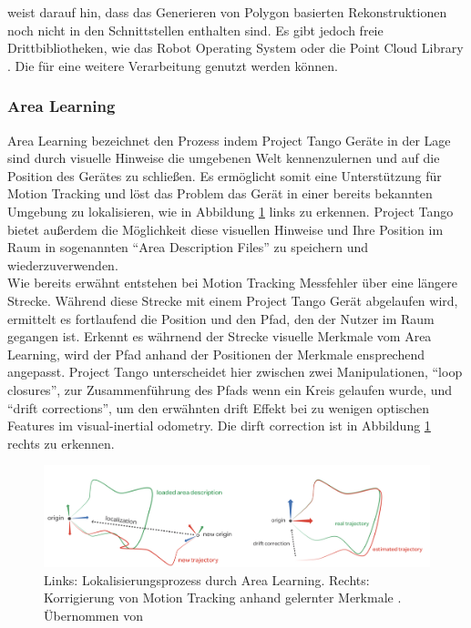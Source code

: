 \citet{GoogleDevelopersConcepts:online} weist darauf hin, dass das Generieren von Polygon basierten Rekonstruktionen noch nicht in den Schnittstellen enthalten sind. Es gibt jedoch freie Drittbibliotheken, wie das Robot Operating System \citep{ROS} oder die Point Cloud Library \citep{pcl}. Die für eine weitere Verarbeitung genutzt werden können.

\subsubsection{Area Learning} \label{subsec:area-learning}

Area Learning bezeichnet den Prozess indem Project Tango Geräte in der Lage sind durch visuelle Hinweise die umgebenen Welt kennenzulernen und auf die Position des Gerätes zu schließen. 
Es ermöglicht somit eine Unterstützung für Motion Tracking und löst das Problem das Gerät in einer bereits bekannten Umgebung zu lokalisieren, wie in Abbildung \ref{fig:area-learning} links zu erkennen.
Project Tango bietet außerdem die Möglichkeit diese visuellen Hinweise und Ihre Position im Raum in sogenannten \enquote{Area Description Files} zu speichern und wiederzuverwenden. \citep{GoogleDevelopersConcepts:online}\\

Wie bereits erwähnt entstehen bei Motion Tracking Messfehler über eine längere Strecke. 
Während diese Strecke mit einem Project Tango Gerät abgelaufen wird, ermittelt es fortlaufend die Position und den Pfad, den der Nutzer im Raum gegangen ist. 
Erkennt es währnend der Strecke visuelle Merkmale vom Area Learning, wird der Pfad anhand der Positionen der Merkmale ensprechend angepasst. 
Project Tango unterscheidet hier zwischen zwei Manipulationen, \enquote{loop closures}, zur Zusammenführung des Pfads wenn ein Kreis gelaufen wurde, und \enquote{drift corrections}, um den erwähnten drift Effekt bei zu wenigen optischen Features im visual-inertial odometry. 
Die dirft correction ist in Abbildung \ref{fig:area-learning} rechts zu erkennen.
\citep{GoogleDevelopersConcepts:online}\\

\begin{figure}[h]
  \centering
	\includegraphics[width=1.0\textwidth]{content/images/theory/tango-area-learning.png} 
  \caption{Links: Lokalisierungsprozess durch Area Learning. Rechts: Korrigierung von Motion Tracking anhand gelernter Merkmale . Übernommen von \citet{GoogleDevelopers:online}}
  \label{fig:area-learning}
\end{figure}

